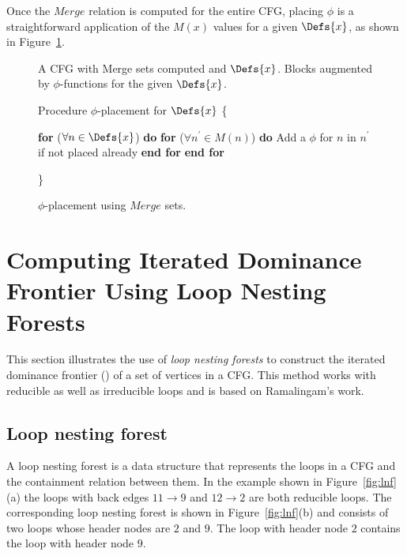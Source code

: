 {%
Once the $Merge$ relation is computed for the entire CFG, placing $\phi$ is a straightforward application of the $M(x)$ values for a given $\Defs{x}$, as shown in Figure~\ref{F:phip}.
\begin{figure}[!ht]
\centering
\begin{minipage}[t]{5in}
 A CFG with Merge sets computed and $\Defs{x}$.
 Blocks augmented by $\phi$-functions for the given $\Defs{x}$.

\setcounter{linectr}{0}

Procedure $\phi$-placement for $\Defs{x}$
\{
\begin{code}
 {\bf for} ($\forall n \in \Defs{x}$) {\bf do}
   {\bf for} ($\forall n^{'} \in M(n)$) {\bf do}
       Add a $\phi$ for $n$ in $n^{'}$ if not placed already
   {\bf end for}
 {\bf end for}
\end{code}
\}
\end{minipage}
\caption{$\phi$-placement using $Merge$ sets.}
\label{F:phip}
\end{figure} 


\section{Computing Iterated Dominance Frontier Using Loop Nesting Forests}
\label{section:alternative_ssa_construction_algorithms:loop}
This section illustrates the use of \emph{loop nesting forests} to construct 
the iterated dominance frontier (\iDF) of a set of vertices in a CFG. This 
method works with reducible as well as irreducible loops and is based on 
Ramalingam's work.

\subsection{Loop nesting forest}
A loop nesting forest is a data structure that represents the loops in a CFG 
and the containment relation between them. In the example shown in 
Figure~\ref{fig:lnf}(a) the loops with back edges $11 \rightarrow 9$ and $12 \rightarrow 2$ are both reducible loops. The corresponding loop nesting forest is shown in Figure~\ref{fig:lnf}(b) and consists of two loops whose header nodes are $2$ and $9$. The loop with header node $2$ contains the loop with header node $9$.

}

